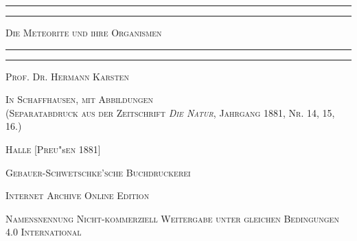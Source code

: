 \documentclass[a4paper, 11pt, oneside]{article}
\begin{document}
\frakfamily
\begin{titlepage} %
	\centering %

	
	\rule{\textwidth}{1.6pt}\vspace*{-\baselineskip}\vspace*{2pt} %
	\rule{\textwidth}{0.4pt} %
	
	\vspace{1.5\baselineskip} %
	
	{\scshape\LARGE Die Meteorite und ihre Organismen}
	
	\vspace{1\baselineskip} %

	\rule{\textwidth}{0.4pt}\vspace*{-\baselineskip}\vspace{3.2pt} %
	\rule{\textwidth}{1.6pt} %
	
	\vspace{1\baselineskip} %
	
	
	{\scshape Prof. Dr. Hermann Karsten} %
	
	\vspace*{1\baselineskip} %
	
    {\scshape\small In Schaffhausen, mit Abbildungen\\ (Separatabdruck aus der Zeitschrift \emph{Die Natur}, Jahrgang 1881, Nr. 14, 15, 16.)} %
    
    \vspace*{\fill}

	\vspace{1\baselineskip}

	{\small\scshape Halle [Preu}\small "s{\small\scshape en 1881]}
	
	{\small\scshape{Gebauer-Schwetschke'sche Buchdruckerei}}
	
	\vspace{0.5\baselineskip} %

    \scshape Internet Archive Online Edition  %
	
	{\scshape\small Namensnennung Nicht-kommerziell Weitergabe unter gleichen Bedingungen 4.0 International} %
\end{titlepage}
\setlength{\parskip}{1mm plus1mm minus1mm}
\clearpage
\tableofcontents
\clearpage
\end{document}
